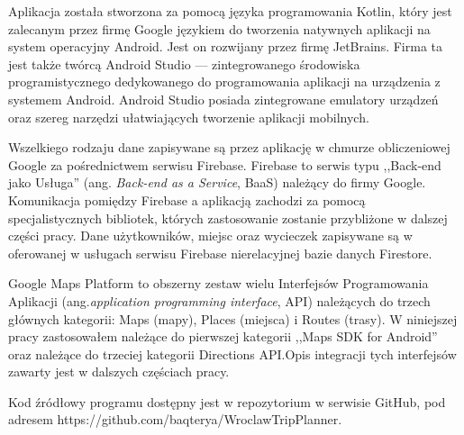     Aplikacja została stworzona za pomocą języka programowania Kotlin, który jest zalecanym przez firmę Google językiem do tworzenia natywnych aplikacji na system operacyjny Android.
    Jest on rozwijany przez firmę JetBrains. Firma ta jest także twórcą Android Studio --- zintegrowanego środowiska programistycznego dedykowanego do programowania aplikacji na urządzenia
    z systemem Android. Android Studio posiada zintegrowane emulatory urządzeń oraz szereg narzędzi ułatwiających tworzenie aplikacji mobilnych. 

    Wszelkiego rodzaju dane zapisywane są przez aplikację w chmurze obliczeniowej Google za pośrednictwem serwisu Firebase. Firebase to serwis typu ,,Back-end jako Usługa'' 
    (ang. \emph{Back-end as a Service}, BaaS) należący do firmy Google. Komunikacja pomiędzy Firebase a aplikacją zachodzi za pomocą specjalistycznych bibliotek, których zastosowanie zostanie
    przybliżone w dalszej części pracy. Dane użytkowników, miejsc oraz wycieczek zapisywane są w oferowanej w usługach serwisu Firebase nierelacyjnej bazie danych Firestore. 

    Google Maps Platform to obszerny zestaw wielu Interfejsów Programowania Aplikacji (ang.\@ \emph{application programming interface}, API) należących do trzech głównych kategorii:
    Maps (mapy), Places (miejsca) i Routes (trasy). W niniejszej pracy zastosowałem należące do pierwszej kategorii ,,Maps SDK for Android'' oraz należące do trzeciej
    kategorii Directions API.\@ Opis integracji tych interfejsów zawarty jest w dalszych częściach pracy.

    Kod źródłowy programu dostępny jest w repozytorium w serwisie GitHub, pod adresem https://github.com/baqterya/WroclawTripPlanner.